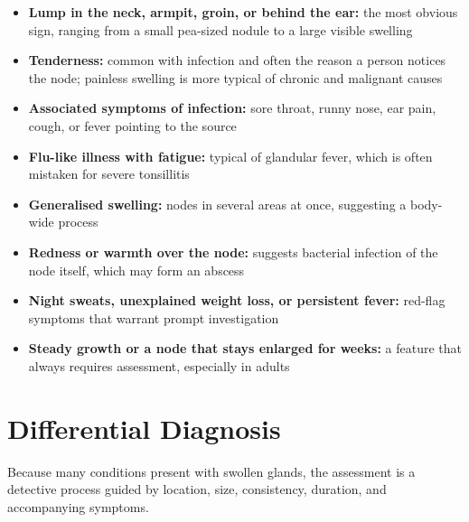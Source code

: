 \begin{itemize}
    \item \textbf{Lump in the neck, armpit, groin, or behind the ear:} the most obvious sign, ranging from a small pea-sized nodule to a large visible swelling
    \item \textbf{Tenderness:} common with infection and often the reason a person notices the node; painless swelling is more typical of chronic and malignant causes
    \item \textbf{Associated symptoms of infection:} sore throat, runny nose, ear pain, cough, or fever pointing to the source
    \item \textbf{Flu-like illness with fatigue:} typical of glandular fever, which is often mistaken for severe tonsillitis
    \item \textbf{Generalised swelling:} nodes in several areas at once, suggesting a body-wide process
    \item \textbf{Redness or warmth over the node:} suggests bacterial infection of the node itself, which may form an abscess
    \item \textbf{Night sweats, unexplained weight loss, or persistent fever:} red-flag symptoms that warrant prompt investigation
    \item \textbf{Steady growth or a node that stays enlarged for weeks:} a feature that always requires assessment, especially in adults
\end{itemize}

\section*{Differential Diagnosis}
Because many conditions present with swollen glands, the assessment is a detective process guided by location, size, consistency, duration, and accompanying symptoms.

